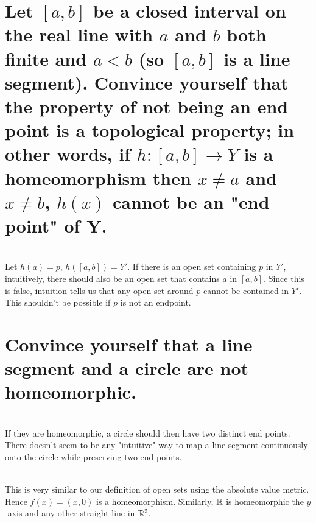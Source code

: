 \begin{parts}
 
 \part{Let $[a,b]$ be a closed interval on the real line with $a$ and $b$ both finite and $a < b$ (so $[a,b]$ is a line segment). Convince yourself that the property of not being an end point is a topological property; in other words, if $h:[a,b] \rightarrow Y$ is a homeomorphism then $x \neq a$ and $x \neq b$, $h(x)$ cannot be an "end point" of Y.}
 
 
\begin{solution}
 \\Let $h(a) = p$, $h([a,b]) = Y'$. If there is an open set containing $p$ in $Y'$, intuitively, there should also be an open set that contains $a$ in $[a,b]$. Since this is false, intuition tells us that any open set around $p$ cannot be contained in $Y'$. This shouldn't be possible if $p$ is not an endpoint.
\end{solution}

\part{Convince yourself that a line segment and a circle are not homeomorphic.}

\begin{solution}
 \\If they are homeomorphic, a circle should then have two distinct end points. There doesn't seem to be any "intuitive" way to map a line segment continuously onto the circle while preserving two end points.
\end{solution}

\end{parts}


\begin{solution}
 \\This is very similar to our definition of open sets using the absolute value metric. Hence $f(x) = (x,0)$ is a homeomorphism. Similarly, $\mathbb{R}$ is homeomorphic the $y$-axis and any other straight line in $\mathbb{R}^2$.
\end{solution}